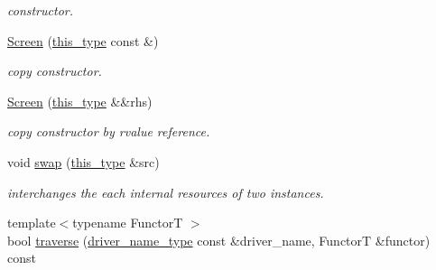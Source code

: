 \begin{DoxyCompactItemize}
\begin{DoxyCompactList}\small\item\em constructor. \end{DoxyCompactList}\item 
\hypertarget{classhryky_1_1display_1_1_screen_a8689cb4b01745b82d7b08fa43ae5da04}{\hyperlink{classhryky_1_1display_1_1_screen_a8689cb4b01745b82d7b08fa43ae5da04}{Screen} (\hyperlink{classhryky_1_1display_1_1_screen_a83363e4f31308e9b77bc99f86d659b7b}{this\-\_\-type} const \&)}\label{classhryky_1_1display_1_1_screen_a8689cb4b01745b82d7b08fa43ae5da04}

\begin{DoxyCompactList}\small\item\em copy constructor. \end{DoxyCompactList}\item 
\hypertarget{classhryky_1_1display_1_1_screen_af88b7a0a5a19f97f8e7a5a7f1e248025}{\hyperlink{classhryky_1_1display_1_1_screen_af88b7a0a5a19f97f8e7a5a7f1e248025}{Screen} (\hyperlink{classhryky_1_1display_1_1_screen_a83363e4f31308e9b77bc99f86d659b7b}{this\-\_\-type} \&\&rhs)}\label{classhryky_1_1display_1_1_screen_af88b7a0a5a19f97f8e7a5a7f1e248025}

\begin{DoxyCompactList}\small\item\em copy constructor by rvalue reference. \end{DoxyCompactList}\item 
\hypertarget{classhryky_1_1display_1_1_screen_a2102e2a1ee2d94af8294209c95e35c52}{void \hyperlink{classhryky_1_1display_1_1_screen_a2102e2a1ee2d94af8294209c95e35c52}{swap} (\hyperlink{classhryky_1_1display_1_1_screen_a83363e4f31308e9b77bc99f86d659b7b}{this\-\_\-type} \&src)}\label{classhryky_1_1display_1_1_screen_a2102e2a1ee2d94af8294209c95e35c52}

\begin{DoxyCompactList}\small\item\em interchanges the each internal resources of two instances. \end{DoxyCompactList}\item 
\hypertarget{classhryky_1_1display_1_1_screen_a463c4efa1605ddda167d86baf49ae79c}{{\footnotesize template$<$typename Functor\-T $>$ }\\bool \hyperlink{classhryky_1_1display_1_1_screen_a463c4efa1605ddda167d86baf49ae79c}{traverse} (\hyperlink{namespacehryky_1_1display_a393bfca9f51ab987a1e795c8502c4db4}{driver\-\_\-name\-\_\-type} const \&driver\-\_\-name, Functor\-T \&functor) const }\label{classhryky_1_1display_1_1_screen_a463c4efa1605ddda167d86baf49ae79c}


\end{DoxyCompactItemize}
